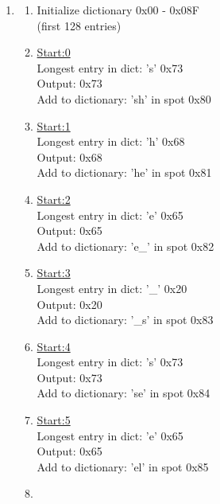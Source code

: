 \documentclass[11pt]{article}
\begin{document}
\begin{enumerate}
     \item
        \begin{multicols}{2}
        \begin{enumerate}
            \item
                Initialize dictionary 0x00 - 0x08F \\
                (first 128 entries)
            \item
                \underline{Start:0}  \\
                Longest entry in dict: 's' 0x73 \\
                Output: 0x73    \\
                Add to dictionary: 'sh' in spot 0x80    
              \item
                \underline{Start:1}  \\
                Longest entry in dict: 'h' 0x68 \\
                Output: 0x68    \\
                Add to dictionary: 'he' in spot 0x81    
            \item
                \underline{Start:2}  \\
                Longest entry in dict: 'e' 0x65 \\
                Output: 0x65    \\
                Add to dictionary: 'e\_' in spot 0x82    
             \item
                \underline{Start:3}  \\
                Longest entry in dict: '\_' 0x20 \\
                Output: 0x20    \\
                Add to dictionary: '\_s' in spot 0x83    
             \item
                \underline{Start:4}  \\
                Longest entry in dict: 's' 0x73 \\
                Output: 0x73    \\
                Add to dictionary: 'se' in spot 0x84    
             \item
                \underline{Start:5}  \\
                Longest entry in dict: 'e' 0x65 \\
                Output: 0x65    \\
                Add to dictionary: 'el' in spot 0x85    
             \item

\end{enumerate}
\end{multicols}
\end{enumerate}
\end{document}
